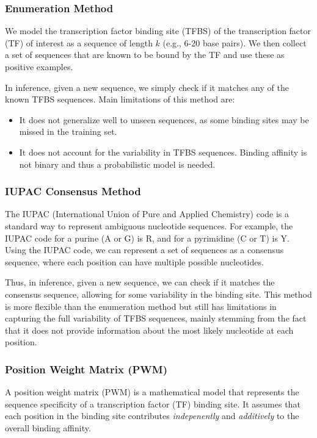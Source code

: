 \documentclass[a4paper]{article}
\begin{document}
\subsubsection*{Enumeration Method}

We model the transcription factor binding site (TFBS) of the transcription
factor (TF) of interest as a sequence of length $k$ (e.g., 6-20 base pairs).
We then collect a set of sequences that are known to be bound by the TF and
use these as positive examples. 

In inference, given a new sequence, we simply check if it matches any of the
known TFBS sequences. Main limitations of this method are:
\begin{itemize}
    \item It does not generalize well to unseen sequences, as some
    binding sites may be missed in the training set.
    \item It does not account for the variability in TFBS sequences. Binding
    affinity is not binary and thus a probabilistic model is needed.
\end{itemize}

\subsubsection*{IUPAC Consensus Method}

The IUPAC (International Union of Pure and Applied Chemistry) code is a
standard way to represent ambiguous nucleotide sequences. For example, the
IUPAC code for a purine (A or G) is R, and for a pyrimidine (C or T) is Y.
Using the IUPAC code, we can represent a set of sequences as a consensus
sequence, where each position can have multiple possible nucleotides.

Thus, in inference, given a new sequence, we can check if it matches the
consensus sequence, allowing for some variability in the binding site. This
method is more flexible than the enumeration method but still has limitations
in capturing the full variability of TFBS sequences, mainly stemming from
the fact that it does not provide information about the most likely nucleotide
at each position.

\subsubsection*{Position Weight Matrix (PWM)} 

A position weight matrix (PWM) is a mathematical model that represents the
sequence specificity of a transcription factor (TF) binding site. It assumes
that each position in the binding site contributes \textit{indepenently} and
\textit{additively} to the overall binding affinity. 
\end{document}

